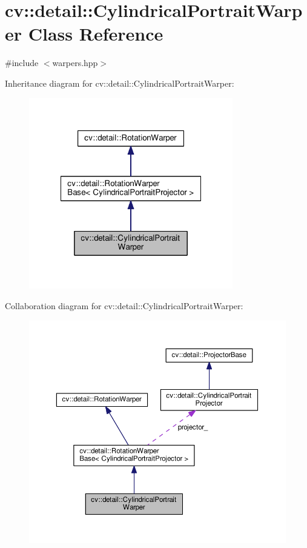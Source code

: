 \hypertarget{classcv_1_1detail_1_1CylindricalPortraitWarper}{\section{cv\-:\-:detail\-:\-:Cylindrical\-Portrait\-Warper Class Reference}
\label{classcv_1_1detail_1_1CylindricalPortraitWarper}
}


{\ttfamily \#include $<$warpers.\-hpp$>$}



Inheritance diagram for cv\-:\-:detail\-:\-:Cylindrical\-Portrait\-Warper\-:\nopagebreak
\begin{figure}[H]
\begin{center}
\leavevmode
\includegraphics[width=252pt]{classcv_1_1detail_1_1CylindricalPortraitWarper__inherit__graph}
\end{center}
\end{figure}


Collaboration diagram for cv\-:\-:detail\-:\-:Cylindrical\-Portrait\-Warper\-:\nopagebreak
\begin{figure}[H]
\begin{center}
\leavevmode
\includegraphics[width=350pt]{classcv_1_1detail_1_1CylindricalPortraitWarper__coll__graph}
\end{center}
\end{figure}

